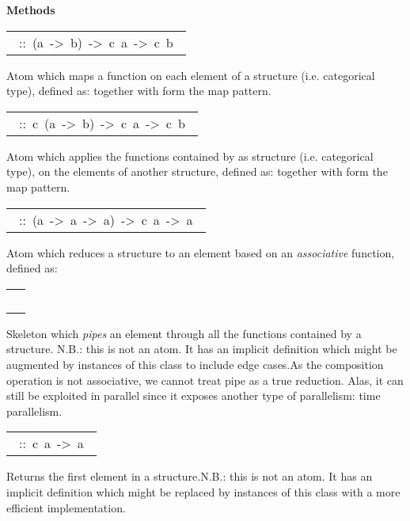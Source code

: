 \begin{haddockdesc}
\haddockpremethods{}\textbf{Methods}
\begin{haddockdesc}
\item[\begin{tabular}{@{}l}\haddockid{(=.=)}\ ::\ (a\ ->\ b)\ ->\ c\ a\ ->\ c\ b\ \end{tabular}]
\haddockbegindoc
Atom which maps a function on each element of a structure (i.e. categorical type), defined as: together with \haddockid{=*=} form the map pattern.\par

\item[\begin{tabular}{@{}l}\haddockid{(=*=)}\ ::\ c\ (a\ ->\ b)\ ->\ c\ a\ ->\ c\ b\ \end{tabular}]
\haddockbegindoc
Atom which applies the functions contained by as structure (i.e. categorical type), on the elements of another structure, defined as: together with \haddockid{=*=} form the map pattern.\par

\item[\begin{tabular}{@{}l}\haddockid{(=\textbackslash=)}\ ::\ (a\ ->\ a\ ->\ a)\ ->\ c\ a\ ->\ a\ \end{tabular}]
\haddockbegindoc
Atom which reduces a structure to an element based on an \emph{associative} function, defined as:\par

\item[\begin{tabular}{@{}l}\haddockid{(=<<=)}\ \end{tabular}]
\haddockbegindoc
Skeleton which \emph{pipes} an element through all the functions contained by a structure. N.B.: this is not an atom. It has an implicit definition which might be augmented by instances of this class to include edge cases.As the composition operation is not associative, we cannot treat pipe as a true reduction. Alas, it can still be exploited in parallel since it exposes another type of parallelism: time parallelism.\par

\item[\begin{tabular}{@{}l}\haddockid{first}\ ::\ c\ a\ ->\ a\ \end{tabular}]
\haddockbegindoc
Returns the first element in a structure.N.B.: this is not an atom. It has an implicit definition which might be replaced by instances of this class with a more efficient implementation.\par


\end{haddockdesc}
\end{haddockdesc}
